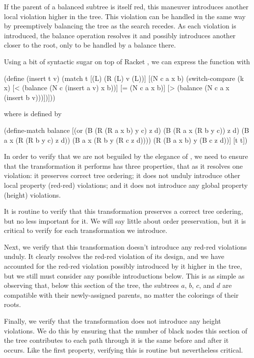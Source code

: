 \documentclass[preprint]{sigplanconf}
\begin{document}
If the parent of a balanced subtree is itself red, this maneuver introduces
another local violation higher in the tree. This violation can be handled in the
same way by preemptively balancing the tree as the search recedes. As each
violation is introduced, the balance operation resolves it and possibly
introduces another closer to the root, only to be handled by a balance there. 

Using a bit of syntactic sugar on top of Racket \cite{plt-tr1}, we can express
the  function with
\begin{schemedisplay}
(define (insert t v)
  (match t
    [(L) (R (L) v (L))]
    [(N c a x b)
     (switch-compare
       (k x)
       [< (balance (N c (insert a v) x b))]
       [= (N c a x b)]
       [> (balance (N c a x (insert b v)))])]))
\end{schemedisplay}
where  is defined by
\begin{schemedisplay}
(define-match balance
  [(or (B (R (R a x b) y c) z d)
       (B (R a x (R b y c)) z d)
       (B a x (R (R b y c) z d))
       (B a x (R b y (R c z d))))
   (R (B a x b) y (B c z d))]
  [t t])
\end{schemedisplay}

In order to verify that we are not beguiled by the elegance of ,
we need to ensure that the transformation it performs has three properties, that
as it resolves one violation: it preserves correct tree ordering; it does not
unduly introduce other local property (red-red) violations; and it does not
introduce any global property (height) violations.

It is routine to verify that this transformation preserves a correct tree
ordering, but no less important for it. We will say little about order
preservation, but it is critical to verify for each transformation we introduce.

Next, we verify that this transformation doesn't introduce any red-red
violations unduly. It clearly resolves the red-red violation of its design, and
we have accounted for the red-red violation possibly introduced by it higher in
the tree, but we still must consider any possible introductions below. This is
as simple as observing that, below this section of the tree, the subtrees $a$,
$b$, $c$, and $d$ are compatible with their newly-assigned parents, no matter
the colorings of their roots.

Finally, we verify that the transformation does not introduce any height
violations. We do this by ensuring that the number of black nodes this section
of the tree contributes to each path through it is the same before and after it
occurs. Like the first property, verifying this is routine but nevertheless
critical.
\end{document}
